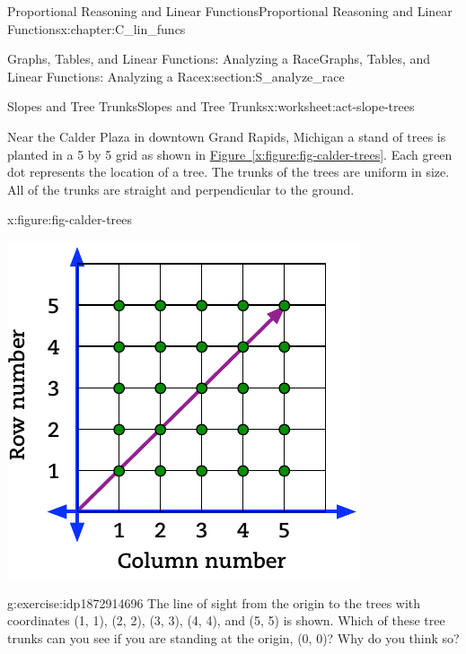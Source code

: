 \documentclass[oneside,10pt,]{book}
\newcommand{\xreffont}{\relax}
\numberwithin{equation}{chapter}
\begin{document}
\begin{chapterptx}{Proportional Reasoning and Linear Functions}{}{Proportional Reasoning and Linear Functions}{}{}{x:chapter:C_lin_funcs}
\begin{sectionptx}{Graphs, Tables, and Linear Functions: Analyzing a Race}{}{Graphs, Tables, and Linear Functions: Analyzing a Race}{}{}{x:section:S_analyze_race}
\typeout{************************************************}
%
\begin{worksheet-subsection}{Slopes and Tree Trunks}{}{Slopes and Tree Trunks}{}{}{x:worksheet:act-slope-trees}
\begin{introduction}{}%
Near the Calder Plaza in downtown Grand Rapids, Michigan a stand of trees is planted in a 5 by 5 grid as shown in \hyperref[x:figure:fig-calder-trees]{Figure~{\xreffont\ref{x:figure:fig-calder-trees}}}. Each green dot represents the location of a tree. The trunks of the trees are uniform in size. All of the trunks are straight and perpendicular to the ground.%
\begin{figureptx}{}{x:figure:fig-calder-trees}{}%
\begin{image}{0.25}{0.5}{0.25}%
\includegraphics[width=\linewidth]{external/calder-trees.pdf}
\end{image}%
\tcblower
\end{figureptx}%
\end{introduction}%
\begin{divisionexercise}{1}{}{}{g:exercise:idp1872914696}%
The line of sight from the origin to the trees with coordinates (1, 1), (2, 2), (3, 3), (4, 4), and (5, 5) is shown. Which of these tree trunks can you see if you are standing at the origin, (0, 0)? Why do you think so?%
\end{divisionexercise}%

\end{worksheet-subsection}
\end{sectionptx}
\end{chapterptx}
\end{document}
